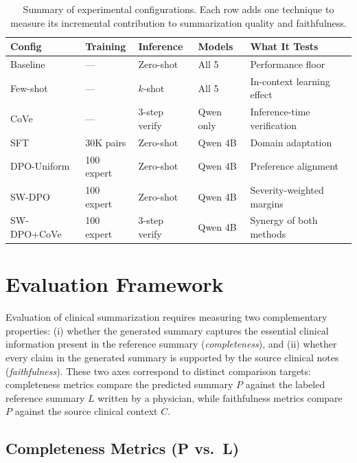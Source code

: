\documentclass[12pt,a4paper,oneside]{report}
\begin{document}
\begin{table}[htbp]
\centering
\caption{Summary of experimental configurations. Each row adds one technique to measure its incremental contribution to summarization quality and faithfulness.}
\label{tab:ablation-summary}
\small
\begin{tabular}{llllp{4.5cm}}
\toprule
\textbf{Config} & \textbf{Training} & \textbf{Inference} & \textbf{Models} & \textbf{What It Tests} \\
\midrule
Baseline     & ---          & Zero-shot      & All 5   & Performance floor \\
Few-shot     & ---          & $k$-shot       & All 5   & In-context learning effect \\
CoVe         & ---          & 3-step verify  & Qwen only & Inference-time verification \\
\midrule
SFT          & 30K pairs    & Zero-shot      & Qwen 4B & Domain adaptation \\
DPO-Uniform  & 100 expert   & Zero-shot      & Qwen 4B & Preference alignment \\
SW-DPO       & 100 expert   & Zero-shot      & Qwen 4B & Severity-weighted margins \\
SW-DPO+CoVe  & 100 expert   & 3-step verify  & Qwen 4B & Synergy of both methods \\
\bottomrule
\end{tabular}
\end{table}

\section{Evaluation Framework}
\label{sec:evaluation}


Evaluation of clinical summarization requires measuring two complementary properties: (i) whether the generated summary captures the essential clinical information present in the reference summary (\textit{completeness}), and (ii) whether every claim in the generated summary is supported by the source clinical notes (\textit{faithfulness}). These two axes correspond to distinct comparison targets: completeness metrics compare the predicted summary $P$ against the labeled reference summary $L$ written by a physician, while faithfulness metrics compare $P$ against the source clinical context $C$.

\subsection{Completeness Metrics (P vs.\ L)}
\label{subsec:completeness}
\end{document}
